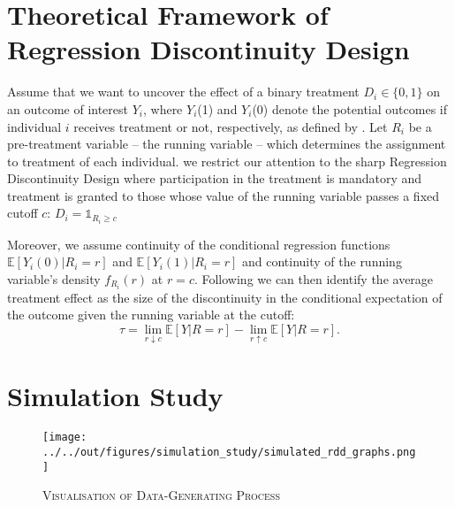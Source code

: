 \documentclass[11pt, a4paper, leqno]{article}
\numberwithin{equation}{section}
\numberwithin{figure}{section}
\numberwithin{table}{section}
\begin{document}
\section{Theoretical Framework of Regression Discontinuity Design} %
\label{sec:framework}

Assume that we want to uncover the effect of a binary treatment $ D_{i} \in \lbrace 0,1 \rbrace $ on an outcome of interest $Y_{i}$, where $Y_{i}$(1) and $Y_{i}$(0) denote the potential outcomes if individual $i$ receives treatment or not, respectively, as defined by \cite{rubin}. Let $R_{i}$ be a pre-treatment variable -- the running variable -- which determines the assignment to treatment of each individual. we restrict our attention to the sharp Regression Discontinuity Design where participation in the treatment is mandatory and treatment is granted to those whose value of the running variable passes a fixed cutoff $c$: $D_{i} = \mathds{1}_{R_{i} \geq c}$

Moreover, we assume continuity of the conditional regression functions $\mathbb{E}\left[Y_{i}(0) \vert R_{i} = r\right]$ and  $\mathbb{E}\left[Y_{i}(1) \vert R_{i} = r\right]$ and continuity of the running variable's density $f_{R_{i}}(r)$ at $r=c$. Following \cite{hahn_et_al} we can then identify the average treatment effect as the size of the discontinuity in the conditional expectation of the outcome given the running variable at the cutoff:
\begin{equation}
\tau = \lim_{r \downarrow c} \mathbb{E}\left[Y \vert R = r\right] - \lim_{r \uparrow c} \mathbb{E}\left[ Y \vert R = r\right].
\label{eq: ident_ass}
\end{equation}





\section{Simulation Study} %
\label{sec:sim_study}




\begin{figure}[H]
	\centering
	\texttt{[image: ../../out/figures/simulation\_study/simulated\_rdd\_graphs.png]}
	\caption{\textsc{Visualisation of Data-Generating Process}}
	\label{fig: dgp}
\end{figure}
\end{document}

